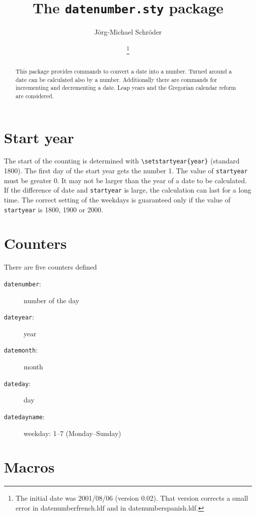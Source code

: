 \documentclass[draft]{article}
\title{The {\tt datenumber.sty} package \fileversion}
\author{J\"org-Michael Schr\"oder\\%
}
\date{\filedate\footnote{The initial date was 2001/08/06 (version 0.02). That version corrects a small error in datenumberfrench.ldf and in datenumberspanish.ldf.}}
\begin{document}
\maketitle
\begin{abstract}

This package provides commands to convert a date into a number. Turned around a date can be calculated also by a number. Additionally there are commands for incrementing and decrementing a date. Leap years and the Gregorian calendar reform are considered.
\end{abstract}

\tableofcontents
\section{Start year}
The start of the counting is determined with \verb+\setstartyear{year}+ (standard 1800). The first day of the start year gets the number 1. The value of \texttt{startyear} must be greater 0. It may not be larger than the year of a date to be calculated. If the difference of date and \texttt{startyear} is large, the calculation can last for a long time. The correct setting of the weekdays is guaranteed only if the value of \texttt{startyear} is 1800, 1900 or 2000.
\section{Counters}
There are five counters defined
\begin{description}
\item[\texttt{datenumber}:] number of the day
\item[\texttt{dateyear}:] year
\item[\texttt{datemonth}:] month
\item[\texttt{dateday}:] day
\item[\texttt{datedayname}:] weekday: 1--7 (Monday--Sunday)
\end{description}
\section{Macros}
\end{document}
